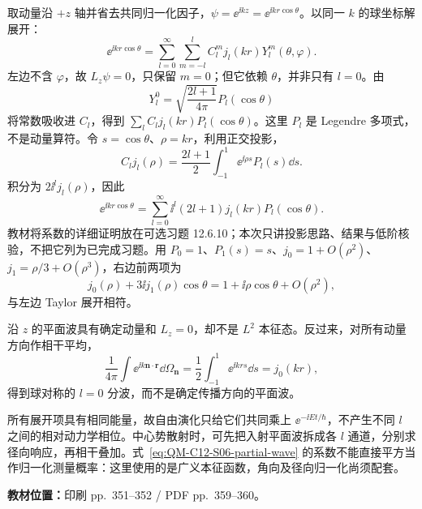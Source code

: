 取动量沿 $+z$ 轴并省去共同归一化因子，$\psi=\ee^{\ii kz}=\ee^{\ii kr\cos\theta}$。以同一 $k$ 的球坐标解展开：
\begin{equation}
  \ee^{\ii kr\cos\theta}
    =\sum_{l=0}^\infty\sum_{m=-l}^l C_l^m j_l(kr)Y_l^m(\theta,\varphi).
\end{equation}
左边不含 $\varphi$，故 $L_z\psi=0$，只保留 $m=0$；但它依赖 $\theta$，并非只有 $l=0$。由
\begin{equation}
  Y_l^0=\sqrt{\frac{2l+1}{4\pi}}P_l(\cos\theta)
\end{equation}
将常数吸收进 $C_l$，得到 $\sum_l C_lj_l(kr)P_l(\cos\theta)$。这里 $P_l$ 是 Legendre 多项式，不是动量算符。令 $s=\cos\theta$、$\rho=kr$，利用正交投影，
\begin{equation}
  C_lj_l(\rho)=\frac{2l+1}{2}\int_{-1}^1\ee^{\ii\rho s}P_l(s)\dd s.
\end{equation}
积分为 $2\ii^lj_l(\rho)$，因此
\begin{equation}
  \boxed{\ee^{\ii kr\cos\theta}
    =\sum_{l=0}^\infty\ii^l(2l+1)j_l(kr)P_l(\cos\theta).}
  \label{eq:QM-C12-S06-partial-wave}
\end{equation}
教材将系数的详细证明放在可选习题 12.6.10；本次只讲投影思路、结果与低阶核验，不把它列为已完成习题。用 $P_0=1$、$P_1(s)=s$、$j_0=1+O(\rho^2)$、$j_1=\rho/3+O(\rho^3)$，右边前两项为
\begin{equation}
  j_0(\rho)+3\ii j_1(\rho)\cos\theta
   =1+\ii\rho\cos\theta+O(\rho^2),
\end{equation}
与左边 Taylor 展开相符。

沿 $z$ 的平面波具有确定动量和 $L_z=0$，却不是 $L^2$ 本征态。反过来，对所有动量方向作相干平均，
\begin{equation}
  \frac1{4\pi}\int\ee^{\ii k\mathbf n\cdot\mathbf r}\dd\Omega_{\mathbf n}
    =\frac12\int_{-1}^1\ee^{\ii krs}\dd s
    =j_0(kr),
\end{equation}
得到球对称的 $l=0$ 分波，而不是确定传播方向的平面波。

所有展开项具有相同能量，故自由演化只给它们共同乘上 $\ee^{-\ii Et/\hbar}$，不产生不同 $l$ 之间的相对动力学相位。中心势散射时，可先把入射平面波拆成各 $l$ 通道，分别求径向响应，再相干叠加。式~\eqref{eq:QM-C12-S06-partial-wave} 的系数不能直接平方当作归一化测量概率：这里使用的是广义本征函数，角向及径向归一化尚须配套。

\textbf{教材位置：}印刷 pp.~351--352 / PDF pp.~359--360。

